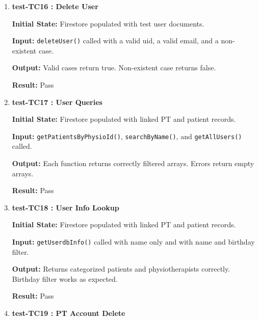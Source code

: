 \documentclass[12pt, titlepage]{article}
\begin{document}
\begin{enumerate}
	\textbf{Initial State:} Firestore populated with test user documents.
	
	\textbf{Input:} \texttt{updateUser()} called with a valid update payload.
	
	\textbf{Output:} Update returns true. Changes reflected in Firestore.
	
	\textbf{Result:} Pass
	
	\vspace{0.5em}
	
	\item \textbf{test-TC16 : Delete User}
	
	\textbf{Initial State:} Firestore populated with test user documents.
	
	\textbf{Input:} \texttt{deleteUser()} called with a valid uid, a valid email, and a non-existent case.
	
	\textbf{Output:} Valid cases return true. Non-existent case returns false.
	
	\textbf{Result:} Pass
	
	\vspace{0.5em}
	
	\item \textbf{test-TC17 : User Queries}
	
	\textbf{Initial State:} Firestore populated with linked PT and patient records.
	
	\textbf{Input:} \texttt{getPatientsByPhysioId()}, \texttt{searchByName()}, and \texttt{getAllUsers()} called.
	
	\textbf{Output:} Each function returns correctly filtered arrays. Errors return empty arrays.
	
	\textbf{Result:} Pass
	
	\vspace{0.5em}
	
	\item \textbf{test-TC18 : User Info Lookup}
	
	\textbf{Initial State:} Firestore populated with linked PT and patient records.
	
	\textbf{Input:} \texttt{getUserdbInfo()} called with name only and with name and birthday filter.
	
	\textbf{Output:} Returns categorized patients and physiotherapists correctly. Birthday filter works as expected.
	
	\textbf{Result:} Pass
	
	\vspace{0.5em}
	
	\item \textbf{test-TC19 : PT Account Delete}
	

\end{enumerate}
\end{document}
